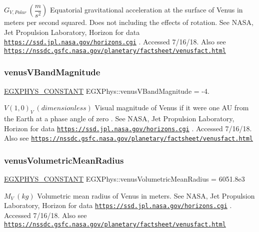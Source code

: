 $ G_{V,Polar} \ (\dfrac{m}{s^2})$ Equatorial gravitational acceleration at the surface of Venus in meters per second squared. Does not including the effects of rotation. See N\+A\+SA, Jet Propulsion Laboratory, Horizon for data \href{https://ssd.jpl.nasa.gov/horizons.cgi}{\tt https\+://ssd.\+jpl.\+nasa.\+gov/horizons.\+cgi} . Accessed 7/16/18. Also see \href{https://nssdc.gsfc.nasa.gov/planetary/factsheet/venusfact.html}{\tt https\+://nssdc.\+gsfc.\+nasa.\+gov/planetary/factsheet/venusfact.\+html} \mbox{\label{group___e_g_x_phys-_constants-_astrophysics-_solar_system-_venus-_bulk_ga7c5dfac5db073d6f546b2aa30e4c6566}} 
\subsubsection{\texorpdfstring{venus\+V\+Band\+Magnitude}{venusVBandMagnitude}}
{\footnotesize\ttfamily \mbox{\hyperlink{group___e_g_x_phys-_constants-_macros_ga76980d288494ce1714c9ac68a95ba702}{E\+G\+X\+P\+H\+Y\+S\+\_\+\+C\+O\+N\+S\+T\+A\+NT}} E\+G\+X\+Phys\+::venus\+V\+Band\+Magnitude = -\/4.}

$ V(1,0)_{V} \ (dimensionless)$ Visual magnitude of Venus if it were one AU from the Earth at a phase angle of zero . See N\+A\+SA, Jet Propulsion Laboratory, Horizon for data \href{https://ssd.jpl.nasa.gov/horizons.cgi}{\tt https\+://ssd.\+jpl.\+nasa.\+gov/horizons.\+cgi} . Accessed 7/16/18. Also see \href{https://nssdc.gsfc.nasa.gov/planetary/factsheet/venusfact.html}{\tt https\+://nssdc.\+gsfc.\+nasa.\+gov/planetary/factsheet/venusfact.\+html} \mbox{\label{group___e_g_x_phys-_constants-_astrophysics-_solar_system-_venus-_bulk_gabd7816eaaceacd8631dffbbc1fdfcb06}} 
\subsubsection{\texorpdfstring{venus\+Volumetric\+Mean\+Radius}{venusVolumetricMeanRadius}}
{\footnotesize\ttfamily \mbox{\hyperlink{group___e_g_x_phys-_constants-_macros_ga76980d288494ce1714c9ac68a95ba702}{E\+G\+X\+P\+H\+Y\+S\+\_\+\+C\+O\+N\+S\+T\+A\+NT}} E\+G\+X\+Phys\+::venus\+Volumetric\+Mean\+Radius = 6051.\+8e3}

$M_{V} \ (kg)$ Volumetric mean radius of Venus in meters. See N\+A\+SA, Jet Propulsion Laboratory, Horizon for data \href{https://ssd.jpl.nasa.gov/horizons.cgi}{\tt https\+://ssd.\+jpl.\+nasa.\+gov/horizons.\+cgi} . Accessed 7/16/18. Also see \href{https://nssdc.gsfc.nasa.gov/planetary/factsheet/venusfact.html}{\tt https\+://nssdc.\+gsfc.\+nasa.\+gov/planetary/factsheet/venusfact.\+html} 